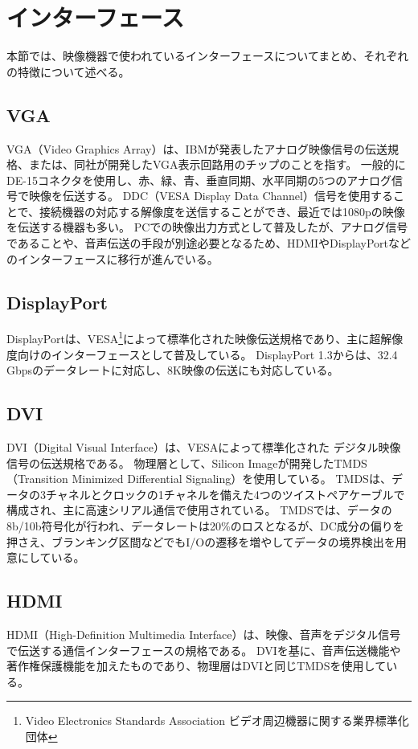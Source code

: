 \section{インターフェース}
\label{sec:interface}
本節では、映像機器で使われているインターフェースについてまとめ、それぞれの特徴について述べる。

\subsection{VGA}
VGA（Video Graphics Array）は、IBMが発表したアナログ映像信号の伝送規格、または、同社が開発したVGA表示回路用のチップのことを指す。
一般的にDE-15コネクタを使用し、赤、緑、青、垂直同期、水平同期の5つのアナログ信号で映像を伝送する。
DDC（VESA Display Data Channel）信号を使用することで、接続機器の対応する解像度を送信することができ、最近では1080pの映像を伝送する機器も多い。
PCでの映像出力方式として普及したが、アナログ信号であることや、音声伝送の手段が別途必要となるため、HDMIやDisplayPortなどのインターフェースに移行が進んでいる。

\subsection{DisplayPort}
DisplayPortは、VESA\footnote{Video Electronics Standards Association ビデオ周辺機器に関する業界標準化団体}によって標準化された映像伝送規格であり、主に超解像度向けのインターフェースとして普及している。
DisplayPort 1.3からは、32.4 Gbpsのデータレートに対応し、8K映像の伝送にも対応している。

\subsection{DVI}
DVI（Digital Visual Interface）は、VESA\footnotemark[1]によって標準化された デジタル映像信号の伝送規格である。
物理層として、Silicon Imageが開発したTMDS（Transition Minimized Differential Signaling）を使用している。
TMDSは、データの3チャネルとクロックの1チャネルを備えた4つのツイストペアケーブルで構成され、主に高速シリアル通信で使用されている。
TMDSでは、データの8b/10b符号化が行われ、データレートは20\%のロスとなるが、DC成分の偏りを押さえ、ブランキング区間などでもI/Oの遷移を増やしてデータの境界検出を用意にしている。

\subsection{HDMI}
HDMI（High-Definition Multimedia Interface）は、映像、音声をデジタル信号で伝送する通信インターフェースの規格である。
DVIを基に、音声伝送機能や著作権保護機能を加えたものであり、物理層はDVIと同じTMDSを使用している。

